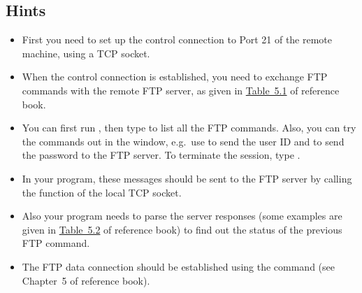 \documentclass{../UTNetLab}
\begin{document}
\subsection*{Hints}
\begin{itemize}
    \item First you need to set up the control connection to Port 21 of the remote machine, using a TCP socket.
    \item When the control connection is established, you need to exchange FTP commands with the remote FTP server, as given in \hyperref[tab:5.1]{Table~5.1} of reference book.
    \item You can first run , then type  to list all the FTP commands.
          Also, you can try the commands out in the  window, e.g.\ use  to send the user ID and  to send the password to the FTP server.
          To terminate the  session, type .
    \item In your program, these messages should be sent to the FTP server by calling the  function of the local TCP socket.
    \item Also your program needs to parse the server responses (some examples are given in \hyperref[tab:5.2]{Table~5.2} of reference book) to find out the status of the previous FTP command.
    \item The FTP data connection should be established using the  command (see Chapter~5 of reference book).
\end{itemize}
\end{document}
